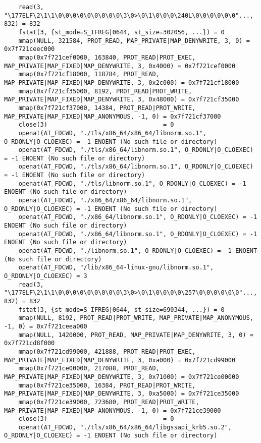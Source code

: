 \documentclass[pdf, unicode, 12pt, a4paper,oneside,fleqn]{article}
\begin{document}
{\begin{verbatim}
    read(3, "\177ELF\2\1\1\0\0\0\0\0\0\0\0\0\3\0>\0\1\0\0\0\240L\0\0\0\0\0\0"..., 832) = 832
    fstat(3, {st_mode=S_IFREG|0644, st_size=302056, ...}) = 0
    mmap(NULL, 321584, PROT_READ, MAP_PRIVATE|MAP_DENYWRITE, 3, 0) = 0x7f721ceec000
    mmap(0x7f721cef0000, 163840, PROT_READ|PROT_EXEC, MAP_PRIVATE|MAP_FIXED|MAP_DENYWRITE, 3, 0x4000) = 0x7f721cef0000
    mmap(0x7f721cf18000, 118784, PROT_READ, MAP_PRIVATE|MAP_FIXED|MAP_DENYWRITE, 3, 0x2c000) = 0x7f721cf18000
    mmap(0x7f721cf35000, 8192, PROT_READ|PROT_WRITE, MAP_PRIVATE|MAP_FIXED|MAP_DENYWRITE, 3, 0x48000) = 0x7f721cf35000
    mmap(0x7f721cf37000, 14384, PROT_READ|PROT_WRITE, MAP_PRIVATE|MAP_FIXED|MAP_ANONYMOUS, -1, 0) = 0x7f721cf37000
    close(3)                                = 0
    openat(AT_FDCWD, "./tls/x86_64/x86_64/libnorm.so.1", O_RDONLY|O_CLOEXEC) = -1 ENOENT (No such file or directory)
    openat(AT_FDCWD, "./tls/x86_64/libnorm.so.1", O_RDONLY|O_CLOEXEC) = -1 ENOENT (No such file or directory)
    openat(AT_FDCWD, "./tls/x86_64/libnorm.so.1", O_RDONLY|O_CLOEXEC) = -1 ENOENT (No such file or directory)
    openat(AT_FDCWD, "./tls/libnorm.so.1", O_RDONLY|O_CLOEXEC) = -1 ENOENT (No such file or directory)
    openat(AT_FDCWD, "./x86_64/x86_64/libnorm.so.1", O_RDONLY|O_CLOEXEC) = -1 ENOENT (No such file or directory)
    openat(AT_FDCWD, "./x86_64/libnorm.so.1", O_RDONLY|O_CLOEXEC) = -1 ENOENT (No such file or directory)
    openat(AT_FDCWD, "./x86_64/libnorm.so.1", O_RDONLY|O_CLOEXEC) = -1 ENOENT (No such file or directory)
    openat(AT_FDCWD, "./libnorm.so.1", O_RDONLY|O_CLOEXEC) = -1 ENOENT (No such file or directory)
    openat(AT_FDCWD, "/lib/x86_64-linux-gnu/libnorm.so.1", O_RDONLY|O_CLOEXEC) = 3
    read(3, "\177ELF\2\1\1\0\0\0\0\0\0\0\0\0\3\0>\0\1\0\0\0\0\257\0\0\0\0\0\0"..., 832) = 832
    fstat(3, {st_mode=S_IFREG|0644, st_size=690344, ...}) = 0
    mmap(NULL, 8192, PROT_READ|PROT_WRITE, MAP_PRIVATE|MAP_ANONYMOUS, -1, 0) = 0x7f721ceea000
    mmap(NULL, 1420000, PROT_READ, MAP_PRIVATE|MAP_DENYWRITE, 3, 0) = 0x7f721cd8f000
    mmap(0x7f721cd99000, 421888, PROT_READ|PROT_EXEC, MAP_PRIVATE|MAP_FIXED|MAP_DENYWRITE, 3, 0xa000) = 0x7f721cd99000
    mmap(0x7f721ce00000, 217088, PROT_READ, MAP_PRIVATE|MAP_FIXED|MAP_DENYWRITE, 3, 0x71000) = 0x7f721ce00000
    mmap(0x7f721ce35000, 16384, PROT_READ|PROT_WRITE, MAP_PRIVATE|MAP_FIXED|MAP_DENYWRITE, 3, 0xa5000) = 0x7f721ce35000
    mmap(0x7f721ce39000, 723680, PROT_READ|PROT_WRITE, MAP_PRIVATE|MAP_FIXED|MAP_ANONYMOUS, -1, 0) = 0x7f721ce39000
    close(3)                                = 0
    openat(AT_FDCWD, "./tls/x86_64/x86_64/libgssapi_krb5.so.2", O_RDONLY|O_CLOEXEC) = -1 ENOENT (No such file or directory)

\end{verbatim}}
\end{document}
